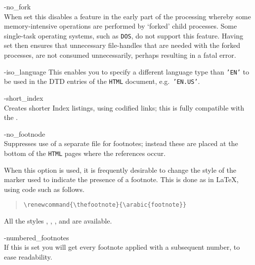 \begin{htmllist}
%

%
\item [ -no\_fork\label{cs_no_fork}]
\\
When set this disables a feature in the early part of the processing
whereby some memory-intensive operations are performed by `forked'
child processes. Some single-task operating systems, such as \texttt{DOS},
do not support this feature. Having  set then ensures
that unnecessary file-handles that are needed with the forked processes,
are not consumed unnecessarily, perhaps resulting in a fatal \Perl{} error.

\item [ -iso\_language \Meta{type}\label{cs_iso_language}]
This enables you to specify a different language type than
\texttt{'EN'} to be used in the DTD entries of the \texttt{HTML}
document, e.g.\ \texttt{'EN.US'}.

\item [ -short\_index\label{cs_shortindex}]
\\
Creates shorter Index listings, using codified links; 
this is fully compatible with the  .

%
%

\item [ -no\_footnode\label{cs_nofootnode}]
\\
Suppresses use of a separate file for footnotes;
instead these are placed at the bottom of the \texttt{HTML} pages 
where the references occur.

When this option is used, it is frequently desirable to change the 
style of the marker used to indicate the presence of a footnote. 
This is done as in \LaTeX, using code such as follows.
\begin{quote}
\verb|\renewcommand{\thefootnote}{\arabic{footnote}}|
\end{quote}
All the styles , , ,  and 
are available.

\item [ -numbered\_footnotes\label{cs_numbered_footnotes}]
\\
If this is set you will get every footnote applied with a subsequent
number, to ease readability.


\end{htmllist}
